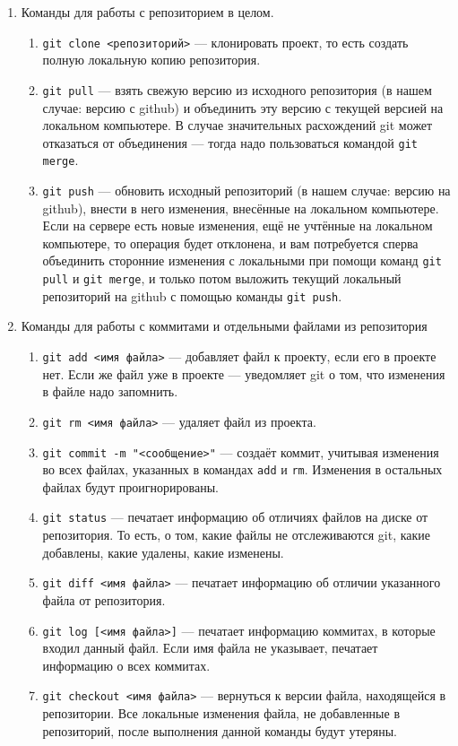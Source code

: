 \documentclass[12pt]{article}
\begin{document}
\begin{enumerate}
\item Команды для работы с репозиторием в целом.

\begin{enumerate}
\item \verb!git clone <репозиторий>! --- клонировать проект, то есть создать полную
локальную копию репозитория. 
\item \verb!git pull! --- взять свежую версию из исходного репозитория 
(в нашем случае: версию с github) и объединить эту версию с текущей версией на 
локальном компьютере. В случае значительных расхождений git может отказаться от
объединения --- тогда надо пользоваться командой \verb!git merge!.
\item \verb!git push! --- обновить исходный репозиторий (в нашем случае: версию на github),
внести в него изменения, внесённые на локальном компьютере. Если на сервере есть
новые изменения, ещё не учтённые на локальном компьютере, то операция будет отклонена,
и вам потребуется сперва объединить сторонние изменения с локальными при помощи
команд \verb!git pull! и \verb!git merge!, и только потом выложить текущий локальный
репозиторий на github с помощью команды \verb!git push!.
\end{enumerate}

\item Команды для работы с коммитами и отдельными файлами из репозитория
\begin{enumerate}
\item \verb!git add <имя файла>! --- добавляет файл к проекту, если его в проекте нет. 
Если же файл уже в проекте --- уведомляет git о том, что изменения в файле надо запомнить.
\item \verb!git rm <имя файла>! --- удаляет файл из проекта.
\item \verb!git commit -m "<сообщение>"! --- создаёт коммит, учитывая изменения во
всех файлах, указанных в командах \verb!add! и \verb!rm!. Изменения в остальных файлах 
будут проигнорированы.
\item \verb!git status! --- печатает информацию об отличиях файлов на диске
от репозитория. То есть, о том, какие файлы не отслеживаются git, какие добавлены, 
какие удалены, какие изменены.
\item \verb!git diff <имя файла>! --- печатает информацию об отличии указанного файла
от репозитория.
\item \verb!git log [<имя файла>]! --- печатает информацию коммитах,
в которые входил данный файл. Если имя файла не указывает, печатает 
информацию о всех коммитах.
\item \verb!git checkout <имя файла>! --- вернуться к версии файла,
находящейся в репозитории. Все локальные изменения файла, не добавленные
в репозиторий, после выполнения данной команды будут утеряны. 
\end{enumerate}
\end{enumerate}
\end{document}
